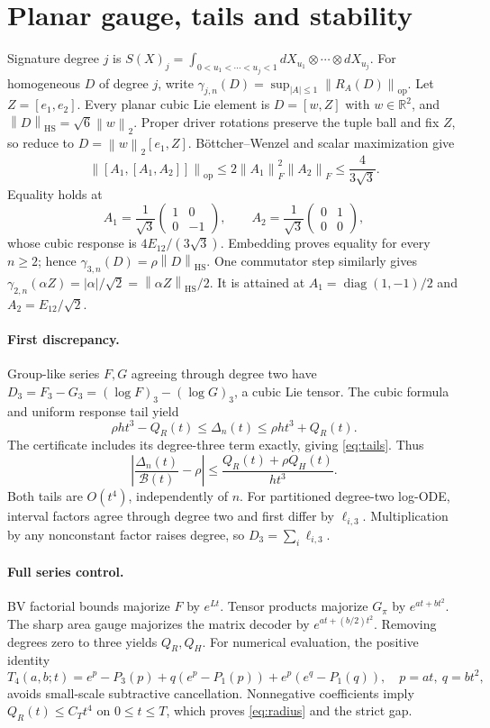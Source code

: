 \documentclass[11pt,a4paper]{article}
\newcommand{\HS}{\mathrm{HS}}
\newcommand{\op}{\mathrm{op}}
\newcommand{\R}{\mathbb R}
\newcommand{\B}{\mathcal B}
\newcommand{\Del}{\Delta}
\newcommand{\norm}[1]{\left\lVert#1\right\rVert}
\begin{document}
\section{Planar gauge, tails and stability}\label{app:planar}
Signature degree \(j\) is
\(S(X)_j=\int_{0<u_1<\cdots<u_j<1}dX_{u_1}\otimes\cdots\otimes dX_{u_j}\).
For homogeneous \(D\) of degree \(j\), write
\(\gamma_{j,n}(D)=\sup_{|A|\le1}\norm{R_A(D)}_{\op}\).
Let \(Z=[e_1,e_2]\). Every planar cubic Lie element is
\(D=[w,Z]\) with \(w\in\R^2\), and
\(\norm{D}_{\HS}=\sqrt6\norm{w}_2\).
Proper driver rotations preserve the tuple ball and fix \(Z\), so reduce to
\(D=\norm{w}_2[e_1,Z]\).
B\"ottcher--Wenzel and scalar maximization give
\[
 \norm{[A_1,[A_1,A_2]]}_{\op}
 \le2\norm{A_1}_F^2\norm{A_2}_F\le\frac4{3\sqrt3}.
\]
Equality holds at
\[
 A_1=\frac1{\sqrt3}\begin{pmatrix}1&0\\0&-1\end{pmatrix},
 \qquad A_2=\frac1{\sqrt3}\begin{pmatrix}0&1\\0&0\end{pmatrix},
\]
whose cubic response is \(4E_{12}/(3\sqrt3)\).
Embedding proves equality for every \(n\ge2\); hence
\(\gamma_{3,n}(D)=\rho\norm D_{\HS}\).
One commutator step similarly gives
\(\gamma_{2,n}(\alpha Z)=|\alpha|/\sqrt2=\norm{\alpha Z}_{\HS}/2\).
It is attained at \(A_1=\operatorname{diag}(1,-1)/2\) and
\(A_2=E_{12}/\sqrt2\).

\paragraph{First discrepancy.}
Group-like series \(F,G\) agreeing through degree two have
\(D_3=F_3-G_3=(\log F)_3-(\log G)_3\), a cubic Lie tensor.
The cubic formula and uniform response tail yield
\[
 \rho ht^3-Q_R(t)\le\Del_n(t)\le\rho ht^3+Q_R(t).
\]
The certificate includes its degree-three term exactly, giving
\eqref{eq:tails}. Thus
\[
 \left|\frac{\Del_n(t)}{\B(t)}-\rho\right|
 \le\frac{Q_R(t)+\rho Q_H(t)}{ht^3}.
\]
Both tails are \(O(t^4)\), independently of \(n\).
For partitioned degree-two log-ODE, interval factors agree through degree two
and first differ by \(\ell_{i,3}\). Multiplication by any nonconstant
factor raises degree, so \(D_3=\sum_i\ell_{i,3}\).

\paragraph{Full series control.}
BV factorial bounds majorize \(F\) by \(e^{Lt}\).
Tensor products majorize \(G_\pi\) by \(e^{at+bt^2}\).
The sharp area gauge majorizes the matrix decoder by
\(e^{at+(b/2)t^2}\). Removing degrees zero to three yields \(Q_R,Q_H\).
For numerical evaluation, the positive identity
\[
 T_4(a,b;t)=e^p-P_3(p)+q(e^p-P_1(p))+e^p(e^q-P_1(q)),
 \quad p=at,\ q=bt^2,
\]
avoids small-scale subtractive cancellation.
Nonnegative coefficients imply \(Q_R(t)\le C_Tt^4\) on \(0\le t\le T\),
which proves \eqref{eq:radius} and the strict gap.
\end{document}
